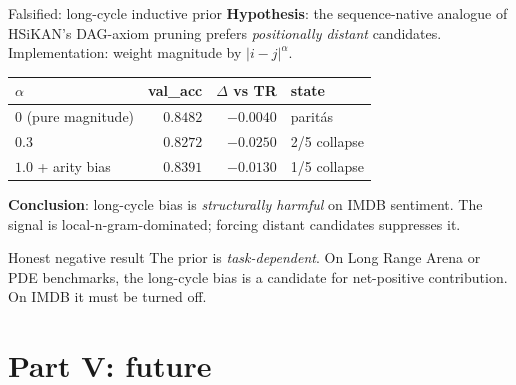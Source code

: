 \documentclass[aspectratio=169, 11pt]{beamer}
\begin{document}
\begin{frame}{Falsified: long-cycle inductive prior}
  \textbf{Hypothesis}: the sequence-native analogue of HSiKAN's
  DAG-axiom pruning prefers \emph{positionally distant} candidates.
  \\[1mm]
  Implementation: weight magnitude by $|i - j|^{\alpha}$.

  \vspace{2mm}
  \begin{center}\small
  \begin{tabular}{lrrl}
  \toprule
  $\alpha$ & val\_acc & $\Delta$ vs TR & state \\
  \midrule
  $0$ (pure magnitude) & $0.8482$ & $-0.0040$ & paritás \\
  $0.3$                 & $0.8272$ & $-0.0250$ & 2/5 collapse \\
  $1.0$ + arity bias    & $0.8391$ & $-0.0130$ & 1/5 collapse \\
  \bottomrule
  \end{tabular}
  \end{center}

  \vspace{2mm}
  \textbf{Conclusion}: long-cycle bias is \emph{structurally harmful} on
  IMDB sentiment. The signal is local-n-gram-dominated; forcing distant
  candidates suppresses it.

  \begin{block}{Honest negative result}
  The prior is \emph{task-dependent}. On Long Range Arena or PDE
  benchmarks, the long-cycle bias is a candidate for net-positive
  contribution. On IMDB it must be turned off.
  \end{block}
\end{frame}

\section{Part V: future}
\end{document}
